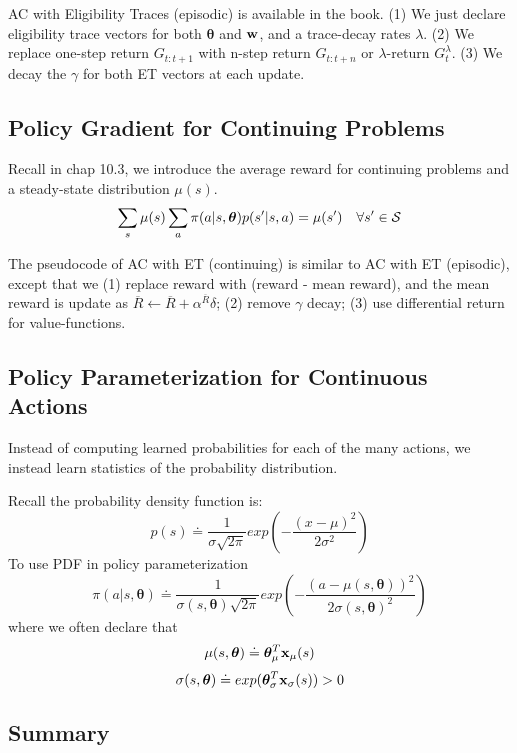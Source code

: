 \documentclass[sutton_barto_notes.tex]{subfiles}
\begin{document}
AC with Eligibility Traces (episodic) is available in the book. (1) We just declare eligibility trace vectors for both $\bm{\theta}$ and ${\operatorname*{\mathbf{w}}}$, and a trace-decay rates $\lambda$. (2) We replace one-step return $G_{t:t+1}$ with n-step return $G_{t:t+n}$ or $\lambda$-return $G_t^\lambda$. (3) We decay the $\gamma$ for both ET vectors at each update.

\subsection{Policy Gradient for Continuing Problems}

Recall in chap 10.3, we introduce the average reward for continuing problems and a steady-state distribution $\mu(s)$.
$$\sum_s \mu(s) \sum_a \pi(a|s,\bm{\theta}) p(s'|s,a) = \mu(s')\quad \forall s' \in \operatorname*{\mathcal{S}}$$

The pseudocode of AC with ET (continuing) is similar to AC with ET (episodic), except that we (1) replace reward with (reward - mean reward), and the mean reward is update as $\overline{R}\leftarrow\overline{R}+\alpha^{\overline{R}}\delta$; (2) remove $\gamma$ decay; (3) use differential return for value-functions.

\subsection{Policy Parameterization for Continuous Actions}

Instead of computing learned probabilities for each of the many actions, we instead learn statistics of the probability distribution.

Recall the probability density function is:
$$p(s)\doteq\frac{1}{\sigma\sqrt{2\pi}}exp(-\frac{(x-\mu)^2}{2\sigma^2})$$
To use PDF in policy parameterization
$$\pi(a|s,\bm{\theta}) \doteq\frac{1}{\sigma(s,\bm{\theta}) \sqrt{2\pi}}exp(-\frac{(a -\mu(s,\bm{\theta}))^2}{2\sigma(s,\bm{\theta})^2})$$
where we often declare that
$$\mu(s,\bm{\theta})\doteq \bm{\theta}_\mu^T {\operatorname*{\mathbf{x}}}_\mu (s)$$
$$\sigma(s,\bm{\theta}) \doteq exp(\bm{\theta}_\sigma^T {\operatorname*{\mathbf{x}}}_\sigma(s)) > 0$$

\subsection{Summary}
\end{document}
